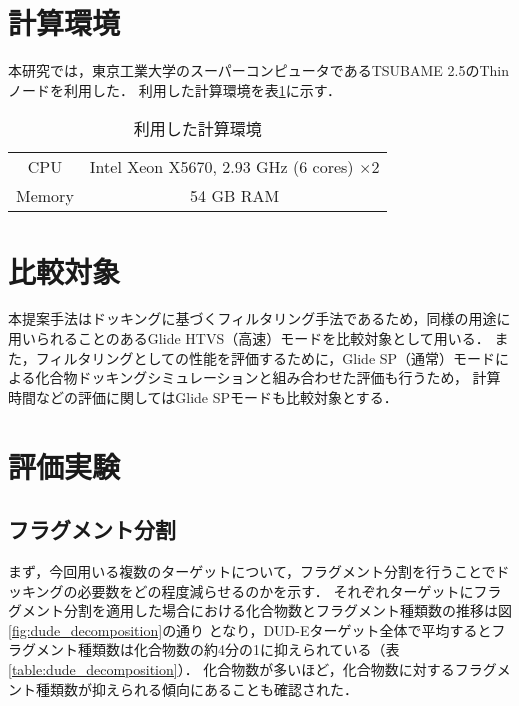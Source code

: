 \section{計算環境}
本研究では，東京工業大学のスーパーコンピュータであるTSUBAME 2.5のThinノードを利用した．
利用した計算環境を表\ref{table:computer_node}に示す．

\begin{table}[htb] \centering
	\caption{利用した計算環境}
	\label{table:computer_node}
	\begin{tabular}{cc}
	\hline
	CPU		&Intel Xeon X5670, 2.93 GHz (6 cores) $\times2$ \\
	Memory	& 54 GB RAM \\ \hline 
	\end{tabular}
	\vspace{-2cm}
\end{table}

\section{比較対象}
本提案手法はドッキングに基づくフィルタリング手法であるため，同様の用途に用いられることのあるGlide HTVS（高速）モードを比較対象として用いる．
また，フィルタリングとしての性能を評価するために，Glide SP（通常）モードによる化合物ドッキングシミュレーションと組み合わせた評価も行うため，
計算時間などの評価に関してはGlide SPモードも比較対象とする．

\section{評価実験}

\subsection{フラグメント分割}\label{subsec:result_decomposition}
まず，今回用いる複数のターゲットについて，フラグメント分割を行うことでドッキングの必要数をどの程度減らせるのかを示す．
それぞれターゲットにフラグメント分割を適用した場合における化合物数とフラグメント種類数の推移は図\ref{fig:dude_decomposition}の通り
となり，DUD-Eターゲット全体で平均するとフラグメント種類数は化合物数の約4分の1に抑えられている（表\ref{table:dude_decomposition}）．
化合物数が多いほど，化合物数に対するフラグメント種類数が抑えられる傾向にあることも確認された．

